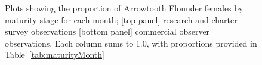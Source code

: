 \begin{figure}[htp]
\captionsetup[subfigure]{labelformat=empty}
\begin{center}
\newline
{}
\end{center}
\caption{Plots showing the proportion of Arrowtooth Flounder females by maturity stage for each month; [top panel] research and charter survey observations [bottom panel] commercial observer observations. Each column sums to 1.0, with proportions provided in Table~\ref{tab:maturityMonth}}
\label{fig:maturity}
\end{figure}

